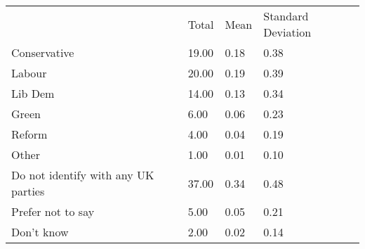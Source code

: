 \documentclass{article}
\begin{document}
\begin{table}[!h]
\centering
\begin{tabular}{llll}
\cline{1-4}
\multicolumn{1}{|l}{} &
  \multicolumn{1}{|l}{Total} &
  \multicolumn{1}{|l}{Mean} &
  \multicolumn{1}{|l|}{Standard Deviation} \\
\cline{1-4}
\multicolumn{1}{|l}{Conservative} &
  \multicolumn{1}{|l}{19.00} &
  \multicolumn{1}{|l}{0.18} &
  \multicolumn{1}{|l|}{0.38} \\
\cline{1-4}
\multicolumn{1}{|l}{Labour} &
  \multicolumn{1}{|l}{20.00} &
  \multicolumn{1}{|l}{0.19} &
  \multicolumn{1}{|l|}{0.39} \\
\cline{1-4}
\multicolumn{1}{|l}{Lib Dem} &
  \multicolumn{1}{|l}{14.00} &
  \multicolumn{1}{|l}{0.13} &
  \multicolumn{1}{|l|}{0.34} \\
\cline{1-4}
\multicolumn{1}{|l}{Green} &
  \multicolumn{1}{|l}{6.00} &
  \multicolumn{1}{|l}{0.06} &
  \multicolumn{1}{|l|}{0.23} \\
\cline{1-4}
\multicolumn{1}{|l}{Reform} &
  \multicolumn{1}{|l}{4.00} &
  \multicolumn{1}{|l}{0.04} &
  \multicolumn{1}{|l|}{0.19} \\
\cline{1-4}
\multicolumn{1}{|l}{Other} &
  \multicolumn{1}{|l}{1.00} &
  \multicolumn{1}{|l}{0.01} &
  \multicolumn{1}{|l|}{0.10} \\
\cline{1-4}
\multicolumn{1}{|l}{Do not identify with any UK parties} &
  \multicolumn{1}{|l}{37.00} &
  \multicolumn{1}{|l}{0.34} &
  \multicolumn{1}{|l|}{0.48} \\
\cline{1-4}
\multicolumn{1}{|l}{Prefer not to say} &
  \multicolumn{1}{|l}{5.00} &
  \multicolumn{1}{|l}{0.05} &
  \multicolumn{1}{|l|}{0.21} \\
\cline{1-4}
\multicolumn{1}{|l}{Don't know} &
  \multicolumn{1}{|l}{2.00} &
  \multicolumn{1}{|l}{0.02} &
  \multicolumn{1}{|l|}{0.14} \\
\cline{1-4}
\end{tabular}
\end{table}
\end{document}
